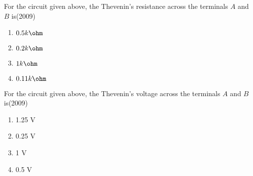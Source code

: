 \item For the circuit given above, the Thevenin's resistance across the terminals $A$ and $B$ is\hfill(2009)
\begin{multicols}{2}
\begin{enumerate}
\item $0.5k\ohm$
\item $0.2k\ohm$
\item $1k\ohm$
\item $0.11k\ohm$
\end{enumerate}
\end{multicols}


\item For the circuit given above, the Thevenin's voltage across the terminals $A$ and $B$ is\hfill(2009)
\begin{multicols}{2}
\begin{enumerate}
\item 1.25 V
\item 0.25 V
\item 1 V
\item 0.5 V
\end{enumerate}
\end{multicols}